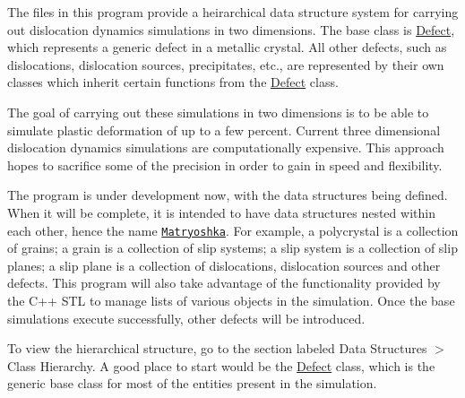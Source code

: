 \-The files in this program provide a heirarchical data structure system for carrying out dislocation dynamics simulations in two dimensions. \-The base class is \hyperlink{classDefect}{\-Defect}, which represents a generic defect in a metallic crystal. \-All other defects, such as dislocations, dislocation sources, precipitates, etc., are represented by their own classes which inherit certain functions from the \hyperlink{classDefect}{\-Defect} class.

\-The goal of carrying out these simulations in two dimensions is to be able to simulate plastic deformation of up to a few percent. \-Current three dimensional dislocation dynamics simulations are computationally expensive. \-This approach hopes to sacrifice some of the precision in order to gain in speed and flexibility.

\-The program is under development now, with the data structures being defined. \-When it will be complete, it is intended to have data structures nested within each other, hence the name \href{https://en.wikipedia.org/wiki/Matryoshka_doll}{\tt \-Matryoshka}. \-For example, a polycrystal is a collection of grains; a grain is a collection of slip systems; a slip system is a collection of slip planes; a slip plane is a collection of dislocations, dislocation sources and other defects. \-This program will also take advantage of the functionality provided by the \-C++ \-S\-T\-L to manage lists of various objects in the simulation. \-Once the base simulations execute successfully, other defects will be introduced.

\-To view the hierarchical structure, go to the section labeled \-Data \-Structures $>$ \-Class \-Hierarchy. \-A good place to start would be the \hyperlink{classDefect}{\-Defect} class, which is the generic base class for most of the entities present in the simulation. 